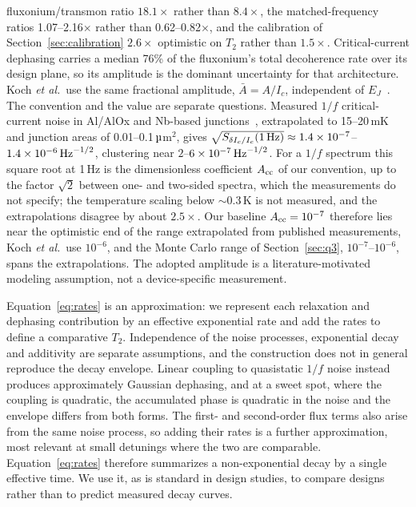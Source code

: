 \documentclass{SciPost}
\providecommand{\upmu}{\text{\fontencoding{TS1}\selectfont\char181}}
\begin{document}
fluxonium/transmon ratio $18.1\times$ rather than $8.4\times$, the matched-frequency ratios
1.07--2.16$\times$ rather than 0.62--0.82$\times$, and the calibration of Section~\ref{sec:calibration}
$2.6\times$ optimistic on $T_2$ rather than $1.5\times$. Critical-current dephasing carries a median 76\% of the fluxonium's total decoherence rate over its design plane, so its amplitude is the dominant uncertainty for that architecture. Koch \emph{et al.}\ use the same fractional amplitude, $\bar A=A/I_c$, independent of
$E_J$~\cite{koch2007}. The convention and the value are separate questions. Measured $1/f$
critical-current noise in Al/AlOx and Nb-based junctions~\cite{vanharlingen2004,eroms2006,nugroho2013},
extrapolated to 15--20\,mK and junction areas of 0.01--0.1\,$\upmu$m$^2$, gives $\sqrt{S_{\delta I_c/I_c}(1\,{\rm Hz})}\approx1.4\times10^{-7}$--$1.4\times10^{-6}\,{\rm Hz}^{-1/2}$,
clustering near $2$--$6\times10^{-7}\,{\rm Hz}^{-1/2}$. For a $1/f$ spectrum this square root at 1\,Hz is
the dimensionless coefficient $A_{\rm cc}$ of our convention, up to the factor $\sqrt2$ between one-
and two-sided spectra, which the measurements do not specify; the temperature scaling below ${\sim}0.3$\,K is not measured, and the
extrapolations disagree by about $2.5\times$. Our baseline $A_{\rm cc}=10^{-7}$ therefore lies near the optimistic end of the range extrapolated from
published measurements, Koch \emph{et al.}\ use $10^{-6}$, and the Monte Carlo range of
Section~\ref{sec:q3}, $10^{-7}$--$10^{-6}$, spans the extrapolations. The adopted amplitude is a literature-motivated modeling assumption, not a
device-specific measurement.

Equation~\eqref{eq:rates} is an approximation: we represent each relaxation and dephasing
contribution by an effective exponential rate and add the rates to define a comparative $T_2$.
Independence of the noise processes, exponential decay and additivity are separate assumptions,
and the construction does not in general reproduce the decay envelope. Linear coupling to quasistatic $1/f$ noise instead produces approximately Gaussian
dephasing, and at a sweet spot, where the coupling is quadratic, the accumulated phase is
quadratic in the noise and the envelope differs from both forms. The first- and second-order flux
terms also arise from the same noise process, so adding their rates is a further approximation,
most relevant at small detunings where the two are comparable. Equation~\eqref{eq:rates}
therefore summarizes a non-exponential decay by a single effective time. We use it, as is
standard in design studies, to compare designs rather than to predict measured decay curves.
\end{document}
